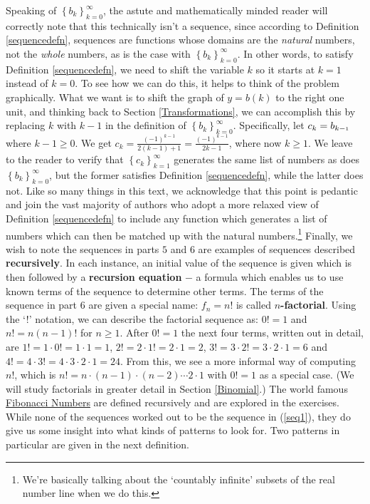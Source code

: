 Speaking of $\left\{ b_{k} \right\}_{k=0}^{\infty}$, the astute and mathematically minded reader will correctly note that this technically isn't a sequence, since according to Definition \ref{sequencedefn}, sequences are functions whose domains are the \textit{natural} numbers, not the \textit{whole} numbers, as is the case with $\left\{ b_{k} \right\}_{k=0}^{\infty}$.  In other words, to satisfy Definition \ref{sequencedefn}, we need to shift the variable $k$ so it starts at $k=1$ instead of $k=0$.  To see how we can do this, it helps to think of the problem graphically.  What we want is to shift the graph of $y=b(k)$ to the right one unit, and thinking back to Section \ref{Transformations}, we can accomplish this by replacing $k$ with $k-1$ in the definition of $\left\{ b_{k} \right\}_{k=0}^{\infty}$.  Specifically, let $c_{k} = b_{k-\mbox{\tiny$1$}}$ where $k - 1 \geq 0$.  We get $c_{k} = \frac{(-1)^{k-1}}{2(k-1)+1} = \frac{(-1)^{k-1}}{2k-1}$, where now $k \geq 1$. We leave to the reader to verify that $\left\{ c_{k} \right\}_{k=1}^{\infty}$ generates the same list of numbers as does $\left\{ b_{k} \right\}_{k=0}^{\infty}$, but the former satisfies Definition \ref{sequencedefn}, while the latter does not.   Like so many things in this text, we acknowledge that this point is pedantic and join the vast majority of authors who adopt a more relaxed view of Definition \ref{sequencedefn} to include any function which generates a list of numbers which can then be matched up with the natural numbers.\footnote{We're basically talking about the `countably infinite' subsets of the real number line when we do this.}   Finally, we wish to note the  sequences in parts $5$ and $6$ are examples of sequences described  \textbf{recursively}.  In each instance, an initial value of the sequence is given which is then followed by a  \textbf{recursion equation} $-$ a formula which enables us to use known terms of the sequence to determine other terms.  The terms of the sequence in part $6$ are given a special name:  $f_{n}=n!$ is called  \textbf{\boldmath $n$-factorial}.  Using the `!' notation, we can describe the factorial sequence as: $0! = 1$ and $n! = n(n-1)!$ for $n \geq 1$.  After $0! = 1$ the next four terms, written out in detail, are $1! = 1 \cdot 0! = 1 \cdot 1 = 1$, $2! = 2 \cdot 1! = 2 \cdot 1 = 2$, $3! = 3 \cdot 2! = 3 \cdot 2 \cdot 1 = 6$ and  $4! = 4 \cdot 3! = 4 \cdot 3 \cdot 2 \cdot 1 = 24$.  From this, we see a more informal way of computing  $n!$, which is $n! = n\cdot(n -1)\cdot(n -2) \cdots 2 \cdot 1$ with $0! = 1$ as a special case.  (We will study factorials in greater detail in Section \ref{Binomial}.)    The world famous \href{http://en.wikipedia.org/wiki/Fibonacci_number}{\underline{Fibonacci Numbers}} are defined recursively and are explored in the exercises.  While none of the sequences worked out to be the sequence in (\ref{seq1}), they do give us some insight into what kinds of patterns to look for.  Two patterns in particular are given in the next definition.

